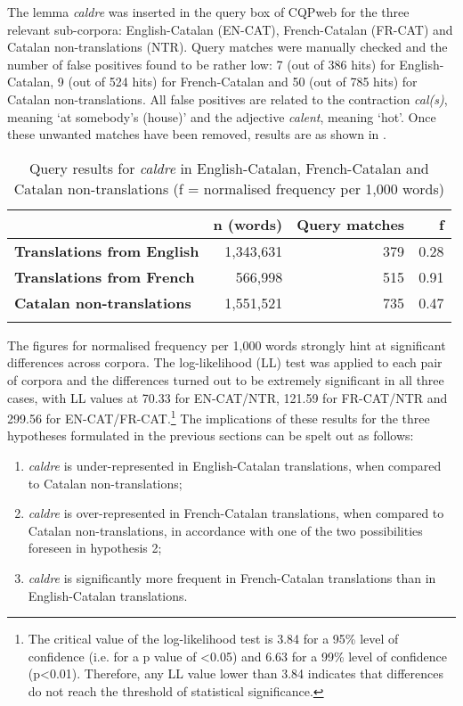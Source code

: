 \documentclass[output=paper,english,spanish,german,english]{langsci/langscibook}
\begin{document}
The lemma \textit{caldre} was inserted in the query box of CQPweb for the three relevant sub-corpora: English-Catalan (EN-CAT), French-Catalan (FR-CAT) and Catalan non-translations (NTR). Query matches were manually checked and the number of false positives found to be rather low: 7 (out of 386 hits) for English-Catalan, 9 (out of 524 hits) for French-Catalan and 50 (out of 785 hits) for Catalan non-translations. All false positives are related to the contraction \textit{cal(s)}, meaning `at somebody’s (house)' and the adjective \textit{calent}, meaning `hot'. Once these unwanted matches have been removed, results are as shown in .

\begin{table}\caption{Query results for \textit{caldre} in English-Catalan, French-Catalan and Catalan non-translations (f = normalised frequency per 1,000 words)}\label{caldre}
  \begin{tabularx}{\textwidth}{Xrrr}
    \lsptoprule
    & {\bfseries n (words)} & {\bfseries Query matches} & {\bfseries f}\\
    \midrule
    {\bfseries Translations from English} & 1,343,631 & 379 & 0.28\\
    {\bfseries Translations from French}  & 566,998   & 515 & 0.91\\
    {\bfseries Catalan non-translations}  & 1,551,521 & 735 & 0.47\\
    \lspbottomrule
  \end{tabularx}
\end{table}

The figures for normalised frequency per 1,000 words strongly hint at significant differences across corpora. The log-likelihood (LL) test was applied to each pair of corpora and the differences turned out to be extremely significant in all three cases, with LL values at 70.33 for EN-CAT\slash NTR, 121.59 for FR-CAT\slash NTR and 299.56 for EN-CAT/FR-CAT.\footnote{The critical value of the log-likelihood test is 3.84 for a 95\% level of confidence (i.e. for a p value of <0.05) and 6.63 for a 99\% level of confidence (p<0.01). Therefore, any LL value lower than 3.84 indicates that differences do not reach the threshold of statistical significance.} The implications of these results for the three hypotheses formulated in the previous sections can be spelt out as follows:

\largerpage[2]
\begin{enumerate}
  \item \textit{caldre} is under-represented in English-Catalan translations, when compared to Catalan non-translations;
  \item \textit{caldre} is over-represented in French-Catalan translations, when compared to Catalan non-translations, in accordance with one of the two possibilities foreseen in hypothesis 2;
  \item \textit{caldre} is significantly more frequent in French-Catalan translations than in English-Catalan translations.
\end{enumerate}
\clearpage
\end{document}
